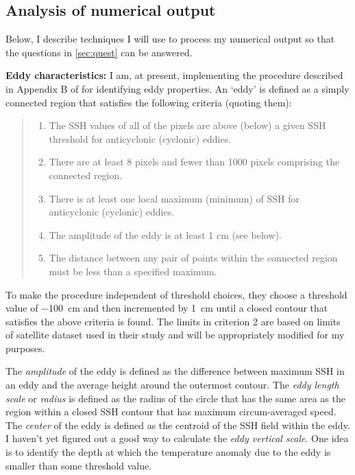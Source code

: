 \subsection{Analysis of numerical output}

Below, I describe techniques I will use to process my numerical output so that the questions in \cref{sec:quest} can be answered.

\textbf{Eddy characteristics:} I am, at present, implementing the procedure described in Appendix B of \cite{Chelton2011} for identifying eddy properties. An ‘eddy’ is defined as a simply connected region that satisfies the following criteria (quoting them): 
\begin{quote}
\begin{enumerate}
\item The SSH values of all of the pixels are above (below) a given SSH threshold for anticyclonic (cyclonic) eddies.
\item There are at least 8 pixels and fewer than 1000 pixels comprising the connected region.
\item There is at least one local maximum (minimum) of SSH for anticyclonic (cyclonic) eddies.
\item The amplitude of the eddy is at least 1 cm (see below).
\item The distance between any pair of points within the connected region must be less than a specified maximum.
\end{enumerate}
\end{quote}
To make the procedure independent of threshold choices, they choose a threshold value of \SI{-100}{\cm} and then incremented by \SI{1}{\cm}  until a closed contour that satisfies the above criteria is found. The limits in criterion 2 are based on limits of satellite dataset used in their study and will be appropriately modified for my purposes. 

The \emph{amplitude} of the eddy is defined as the difference between maximum SSH in an eddy and the average height around the outermost contour. The \emph{eddy length scale} or \emph{radius} is defined as the radius of the circle that has the same area as the region within a closed SSH contour that has maximum circum-averaged speed. The \emph{center} of the eddy is defined as the centroid of the SSH field within the eddy. I haven’t yet figured out a good way to calculate the \emph{eddy vertical scale}. One idea is to identify the depth at which the temperature anomaly due to the eddy is smaller than some threshold value.

